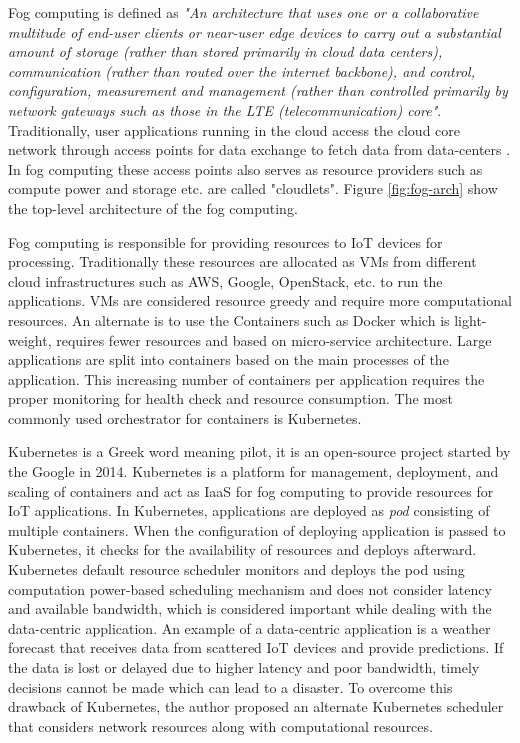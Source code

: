 Fog computing is defined as \emph{"An architecture that uses one or a collaborative multitude of end-user clients or near-user edge devices to carry out a substantial amount of storage (rather than stored primarily in cloud data centers), communication (rather than routed over the internet backbone), and control, configuration, measurement and management (rather than controlled primarily by network gateways such as those in the LTE (telecommunication) core"}\cite{10.1145/3057266}. Traditionally, user applications running in the cloud access the cloud core network through access points for data exchange to fetch data from data-centers \cite{Bittencourt2017}. In fog computing these access points also serves as resource providers such as compute power and storage etc. are called "cloudlets"\cite{Bittencourt2017}. Figure \ref{fig:fog-arch} show the top-level architecture of the fog computing. \par
Fog computing is responsible for providing resources to IoT devices for processing\cite{Santos2019}. Traditionally these resources are allocated as VMs from different cloud infrastructures such as AWS, Google, OpenStack, etc. to run the applications. VMs are considered resource greedy and require more computational resources. An alternate is to use the Containers such as Docker which is light-weight, requires fewer resources and based on micro-service architecture. Large applications are split into containers based on the main processes of the application. This increasing number of containers per application requires the proper monitoring for health check and resource consumption\cite{k8s}. The most commonly used orchestrator for containers is Kubernetes. \par
Kubernetes is a Greek word meaning pilot, it is an open-source project started by the Google in 2014\cite{k8s}. Kubernetes is a platform for management, deployment, and scaling of containers\cite{k8s} and act as IaaS for fog computing to provide resources for IoT applications. In Kubernetes, applications are deployed as \emph{pod} consisting of multiple containers. When the configuration of deploying application is passed to Kubernetes, it checks for the availability of resources and deploys afterward\cite{k8s}. Kubernetes default resource scheduler monitors and deploys the pod using computation power-based scheduling mechanism and does not consider latency and available bandwidth, which is considered important while dealing with the data-centric application\cite{Santos2019}. An example of a data-centric application is a weather forecast that receives data from scattered IoT devices and provide predictions. If the data is lost or delayed due to higher latency and poor bandwidth, timely decisions cannot be made which can lead to a disaster. To overcome this drawback of Kubernetes, the author proposed an alternate Kubernetes scheduler that considers network resources along with computational resources\cite{Santos2019}. \par
